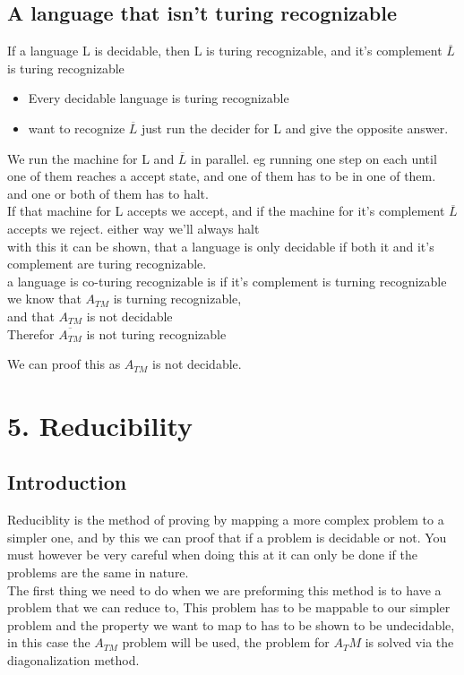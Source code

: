 \documentclass[a4paper,10pt,titlepage]{report}
\begin{document}
\subsection{A language that isn't turing recognizable}

If a language L is decidable, then L is turing recognizable, and it's complement $\overline{L}$ is turing recognizable\\
\begin{itemize}
\item Every decidable language is turing recognizable
\item want to recognize $\overline{L}$ just run the decider for L and give the opposite answer.
\end{itemize}

We run the machine for L and $\overline{L}$ in parallel. eg running one step on each until one of them reaches a accept state, and one of them has to be in one of them. and one or both of them has to halt.\\

If that machine for L accepts we accept, and if the machine for it's complement $\overline{L}$ accepts we reject. either way we'll always halt\\

with this it can be shown, that a language is only decidable if both it and it's complement are turing recognizable. \\

a language is co-turing recognizable is if it's complement is turning recognizable \\

we know that $A_{TM}$ is turning recognizable,\\
and that $A_{TM}$ is not decidable\\

Therefor $\overline{A_{TM}}$ is not turing recognizable

We can proof this as $A_{TM}$ is not decidable.
 
\newpage
\section{5. Reducibility}

\subsection{Introduction}

Reduciblity is the method of proving by mapping a more complex problem to a simpler one, and by this we can proof that if a problem is decidable or not. You must however be very careful when doing this at it can only be done if the problems are the same in nature.\\
The first thing we need to do when we are preforming this method is to have a problem that we can reduce to, This problem has to be mappable to our simpler problem and the property we want to map to has to be shown to be undecidable, in this case the $A_{TM}$ problem will be used, the problem for $A_TM$ is solved via the diagonalization method.
\end{document}
